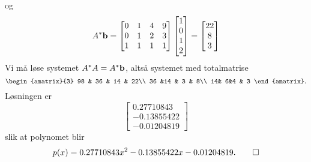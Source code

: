 \begin{ex}
\[\]
og 
\[
A^*\mathbf{b}=
\begin{bmatrix}
0 & 1 & 4 & 9\\  0&1 &2 & 3\\ 1& 1&1 &1 
\end{bmatrix}
\begin{bmatrix}
1 \\ 0 \\ 1 \\ 2
\end{bmatrix} 
=
\begin{bmatrix}
22 \\ 8 \\ 3 
\end{bmatrix}
\]
Vi må løse systemet $A^*A=A^*\mathbf{b}$, altså systemet med totalmatrise
\[
\begin{amatrix}{3}
98 & 36 & 14 & 22\\  36 &14 & 3 & 8\\ 14& 6&4 & 3
\end{amatrix}.
\]
Løsningen er 
\[
\begin{bmatrix}
0.27710843 \\ -0.13855422 \\ -0.01204819 
\end{bmatrix}
\]
slik at polynomet blir 
\[
p(x)=0.27710843x^2  -0.13855422x  -0.01204819. \qedhere
\]
\end{ex}
\kapittelslutt
